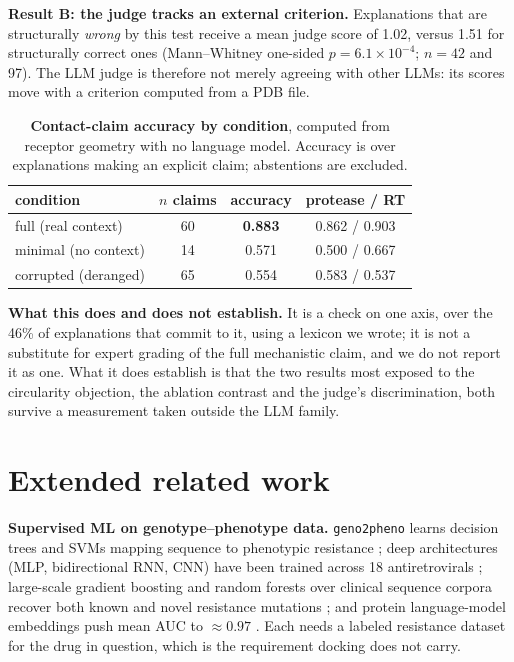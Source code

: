 \documentclass{article}
\begin{document}
\textbf{Result B: the judge tracks an external criterion.} Explanations that are
structurally \emph{wrong} by this test receive a mean judge score of 1.02, versus
1.51 for structurally correct ones (Mann--Whitney one-sided $p=6.1\times10^{-4}$;
$n=42$ and 97). The LLM judge is therefore not merely agreeing with other LLMs:
its scores move with a criterion computed from a PDB file.

\begin{table}[h]
\centering
\caption{\textbf{Contact-claim accuracy by condition}, computed from receptor geometry with no language model. Accuracy is over explanations making an explicit claim; abstentions are excluded.}
\label{tab:struct}
\small
\begin{tabular}{lccc}
\toprule
condition & $n$ claims & accuracy & protease / RT \\
\midrule
full (real context)   & 60 & \textbf{0.883} & 0.862 / 0.903 \\
minimal (no context)  & 14 & 0.571 & 0.500 / 0.667 \\
corrupted (deranged)  & 65 & 0.554 & 0.583 / 0.537 \\
\bottomrule
\end{tabular}
\end{table}

\textbf{What this does and does not establish.} It is a check on one axis, over
the 46\% of explanations that commit to it, using a lexicon we wrote; it is not a
substitute for expert grading of the full mechanistic claim, and we do not report
it as one. What it does establish is that the two results most exposed to the
circularity objection, the ablation contrast and the judge's discrimination,
both survive a measurement taken outside the LLM family.

\section{Extended related work}
\label{app:related}

\textbf{Supervised ML on genotype--phenotype data.} \texttt{geno2pheno} learns
decision trees and SVMs mapping sequence to phenotypic resistance
\citep{beerenwinkel2003}; deep architectures (MLP, bidirectional RNN, CNN) have
been trained across 18 antiretrovirals \citep{steiner2020}; large-scale gradient
boosting and random forests over clinical sequence corpora recover both known and
novel resistance mutations \citep{blassel2021}; and protein language-model
embeddings push mean AUC to $\approx0.97$ \citep{farquhar2026}. Each needs a
labeled resistance dataset for the drug in question, which is the requirement
docking does not carry.
\end{document}
